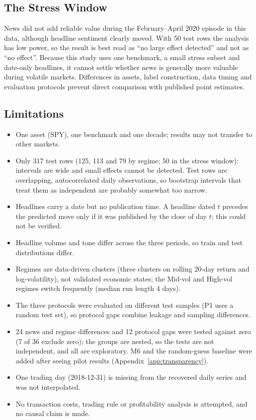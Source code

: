 \subsection{The Stress Window}
News did not add reliable value during the February--April 2020 episode in this data, although headline sentiment clearly moved. With 50 test rows the analysis has low power, so the result is best read as ``no large effect detected'' and not as ``no effect''. Because this study uses one benchmark, a small stress subset and date-only headlines, it cannot settle whether news is generally more valuable during volatile markets. Differences in assets, label construction, data timing and evaluation protocols prevent direct comparison with published point estimates.

\subsection{Limitations}
\begin{itemize}
\item One asset (SPY), one benchmark and one decade; results may not transfer to other markets.
\item Only 317 test rows (125, 113 and 79 by regime; 50 in the stress window): intervals are wide and small effects cannot be detected. Test rows are overlapping, autocorrelated daily observations, so bootstrap intervals that treat them as independent are probably somewhat too narrow.
\item Headlines carry a date but no publication time. A headline dated $t$ precedes the predicted move only if it was published by the close of day $t$; this could not be verified.
\item Headline volume and tone differ across the three periods, so train and test distributions differ.
\item Regimes are data-driven clusters (three clusters on rolling 20-day return and log-volatility), not validated economic states; the Mid-vol and High-vol regimes switch frequently (median run length 4 days).
\item The three protocols were evaluated on different test samples (P1 uses a random test set), so protocol gaps combine leakage and sampling differences.
\item 24 news and regime differences and 12 protocol gaps were tested against zero (7 of 36 exclude zero); the groups are nested, so the tests are not independent, and all are exploratory. M6 and the random-guess baseline were added after seeing pilot results (Appendix~\ref{app:transparency}).
\item One trading day (2018-12-31) is missing from the recovered daily series and was not interpolated.
\item No transaction costs, trading rule or profitability analysis is attempted, and no causal claim is made.
\end{itemize}
